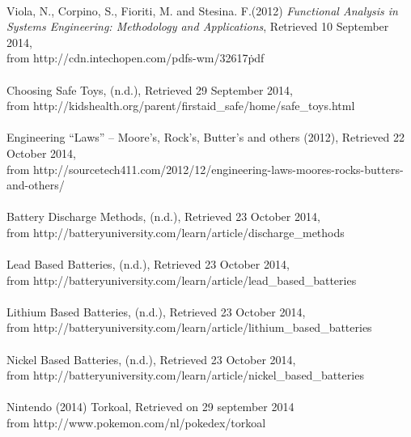 \documentclass[11pt,twoside,a4paper]{report}
\begin{document}
\\
Viola, N., Corpino, S., Fioriti, M. and Stesina. F.(2012) \textit{Functional Analysis in Systems Engineering: Methodology and Applications}, Retrieved 10 September 2014, \\from http://cdn.intechopen.com/pdfs-wm/32617\.pdf \\
\\
Choosing Safe Toys, (n.d.), Retrieved 29 September 2014, \\from http://kidshealth.org/parent/firstaid\_safe/home/safe\_toys.html \\
\\
Engineering “Laws” – Moore’s, Rock’s, Butter’s and others (2012), Retrieved 22 October 2014, \\from http://sourcetech411.com/2012/12/engineering-laws-moores-rocks-butters-and-others/ \\
\\
Battery Discharge Methods, (n.d.), Retrieved 23 October 2014, \\from http://batteryuniversity.com/learn/article/discharge\_methods\\
\\
Lead Based Batteries, (n.d.), Retrieved 23 October 2014, \\from http://batteryuniversity.com/learn/article/lead\_based\_batteries \\
\\
Lithium Based Batteries, (n.d.), Retrieved 23 October 2014, \\from http://batteryuniversity.com/learn/article/lithium\_based\_batteries \\
\\
Nickel Based Batteries, (n.d.), Retrieved 23 October 2014, \\from 
http://batteryuniversity.com/learn/article/nickel\_based\_batteries \\
\\
Nintendo (2014) Torkoal, Retrieved on 29 september 2014\\ from http://www.pokemon.com/nl/pokedex/torkoal
\end{document}
